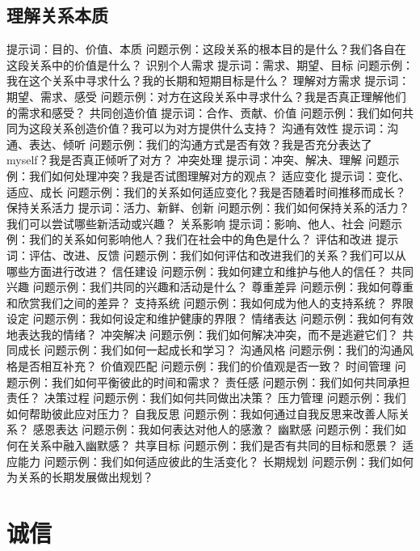 \documentclass[12pt]{book}
\begin{document}
\subsection{理解关系本质}
提示词：目的、价值、本质
问题示例：这段关系的根本目的是什么？我们各自在这段关系中的价值是什么？
识别个人需求
提示词：需求、期望、目标
问题示例：我在这个关系中寻求什么？我的长期和短期目标是什么？
理解对方需求
提示词：期望、需求、感受
问题示例：对方在这段关系中寻求什么？我是否真正理解他们的需求和感受？
共同创造价值
提示词：合作、贡献、价值
问题示例：我们如何共同为这段关系创造价值？我可以为对方提供什么支持？
沟通有效性
提示词：沟通、表达、倾听
问题示例：我们的沟通方式是否有效？我是否充分表达了 myself？我是否真正倾听了对方？
冲突处理
提示词：冲突、解决、理解
问题示例：我们如何处理冲突？我是否试图理解对方的观点？
适应变化
提示词：变化、适应、成长
问题示例：我们的关系如何适应变化？我是否随着时间推移而成长？
保持关系活力
提示词：活力、新鲜、创新
问题示例：我们如何保持关系的活力？我们可以尝试哪些新活动或兴趣？
关系影响
提示词：影响、他人、社会
问题示例：我们的关系如何影响他人？我们在社会中的角色是什么？
评估和改进
提示词：评估、改进、反馈
问题示例：我们如何评估和改进我们的关系？我们可以从哪些方面进行改进？
信任建设
问题示例：我如何建立和维护与他人的信任？
共同兴趣
问题示例：我们共同的兴趣和活动是什么？
尊重差异
问题示例：我如何尊重和欣赏我们之间的差异？
支持系统
问题示例：我如何成为他人的支持系统？
界限设定
问题示例：我如何设定和维护健康的界限？
情绪表达
问题示例：我如何有效地表达我的情绪？
冲突解决
问题示例：我们如何解决冲突，而不是逃避它们？
共同成长
问题示例：我们如何一起成长和学习？
沟通风格
问题示例：我们的沟通风格是否相互补充？
价值观匹配
问题示例：我们的价值观是否一致？
时间管理
问题示例：我们如何平衡彼此的时间和需求？
责任感
问题示例：我们如何共同承担责任？
决策过程
问题示例：我们如何共同做出决策？
压力管理
问题示例：我们如何帮助彼此应对压力？
自我反思
问题示例：我如何通过自我反思来改善人际关系？
感恩表达
问题示例：我如何表达对他人的感激？
幽默感
问题示例：我们如何在关系中融入幽默感？
共享目标
问题示例：我们是否有共同的目标和愿景？
适应能力
问题示例：我们如何适应彼此的生活变化？
长期规划
问题示例：我们如何为关系的长期发展做出规划？


\section{诚信}
\end{document}
